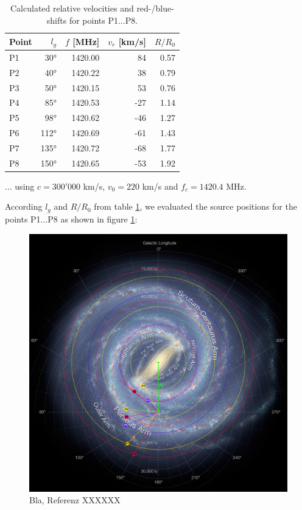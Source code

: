 \begin{table}[H]
\centering \footnotesize
\begin{tabular}{| l || r | r || r | r |}
    \hline 
    Point & $l_g$ & $f$ [MHz] & $v_r$ [km/s] & $R/R_0$\\
    \hline
    \hline 
    P1    &  30°  & 1420.00   &  84          & 0.57 \\
    P2    &  40°  & 1420.22   &  38          & 0.79 \\
    P3    &  50°  & 1420.15   &  53          & 0.76 \\
    P4    &  85°  & 1420.53   & -27          & 1.14 \\
    P5    &  98°  & 1420.62   & -46          & 1.27 \\
    P6    & 112°  & 1420.69   & -61          & 1.43 \\
    P7    & 135°  & 1420.72   & -68          & 1.77 \\
    P8    & 150°  & 1420.65   & -53          & 1.92 \\
    \hline
\end{tabular}
\caption{Calculated relative velocities and red-/blue-shifts for points P1...P8.}
\label{tab:hot_spots}
\end{table}

... using $c=300'000$ km/s, $v_0 = 220$ km/s and $f_c=1420.4$ MHz.

\pagebreak

According $l_g$ and $R/R_0$ from table \ref{tab:hot_spots}, we evaluated the source positions for the points P1...P8 as shown in figure \ref{fig:mw_roi_spots}:

\begin{figure}[H]
    \centering
    \includegraphics[width=\textwidth]{assets/MW_ROI_spots.png}
    \caption{Bla, Referenz XXXXXX}
    \label{fig:mw_roi_spots}
\end{figure}


